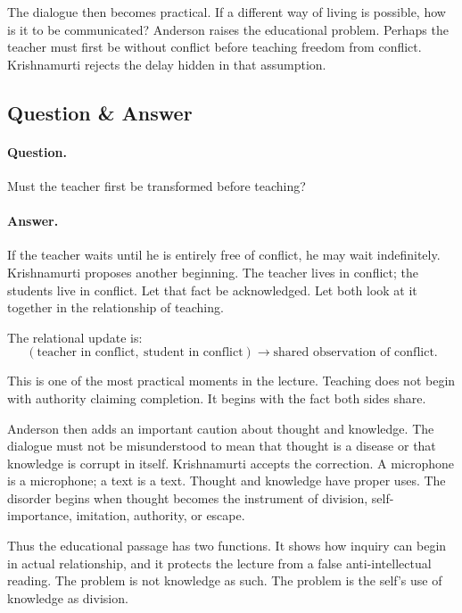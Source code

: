 The dialogue then becomes practical. If a different way of living is possible, how is it to be communicated? Anderson raises the educational problem. Perhaps the teacher must first be without conflict before teaching freedom from conflict. Krishnamurti rejects the delay hidden in that assumption.

\subsection{Question \& Answer}

\paragraph{Question.}
Must the teacher first be transformed before teaching?

\paragraph{Answer.}
If the teacher waits until he is entirely free of conflict, he may wait indefinitely. Krishnamurti proposes another beginning. The teacher lives in conflict; the students live in conflict. Let that fact be acknowledged. Let both look at it together in the relationship of teaching.

The relational update is:
\begin{equation}
(\text{teacher in conflict},\ \text{student in conflict})
   \longrightarrow
\text{shared observation of conflict}.
\end{equation}

This is one of the most practical moments in the lecture. Teaching does not begin with authority claiming completion. It begins with the fact both sides share.

Anderson then adds an important caution about thought and knowledge. The dialogue must not be misunderstood to mean that thought is a disease or that knowledge is corrupt in itself. Krishnamurti accepts the correction. A microphone is a microphone; a text is a text. Thought and knowledge have proper uses. The disorder begins when thought becomes the instrument of division, self-importance, imitation, authority, or escape.

Thus the educational passage has two functions. It shows how inquiry can begin in actual relationship, and it protects the lecture from a false anti-intellectual reading. The problem is not knowledge as such. The problem is the self's use of knowledge as division.

